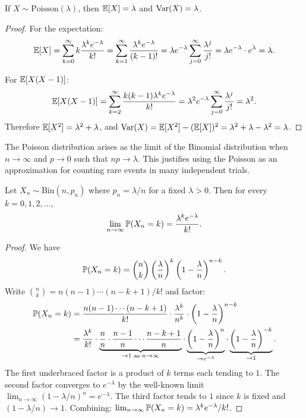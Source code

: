 \documentclass[11pt,a4paper]{article}
\begin{document}
\begin{proposition}
\label{prop:poisson_moments}
If $X \sim \mathrm{Poisson}(\lambda)$, then $\mathbb{E}[X] = \lambda$ and
$\operatorname{Var}(X) = \lambda$.
\end{proposition}

\begin{proof}
For the expectation:
\[
    \mathbb{E}[X] = \sum_{k=0}^\infty k \frac{\lambda^k e^{-\lambda}}{k!}
    = \sum_{k=1}^\infty \frac{\lambda^k e^{-\lambda}}{(k-1)!}
    = \lambda e^{-\lambda} \sum_{j=0}^\infty \frac{\lambda^j}{j!}
    = \lambda e^{-\lambda} \cdot e^\lambda = \lambda.
\]

For $\mathbb{E}[X(X-1)]$:
\[
    \mathbb{E}[X(X-1)] = \sum_{k=2}^\infty \frac{k(k-1) \lambda^k e^{-\lambda}}{k!}
    = \lambda^2 e^{-\lambda} \sum_{j=0}^\infty \frac{\lambda^j}{j!}
    = \lambda^2.
\]
Therefore $\mathbb{E}[X^2] = \lambda^2 + \lambda$, and
$\operatorname{Var}(X) = \mathbb{E}[X^2] - (\mathbb{E}[X])^2 = \lambda^2 + \lambda - \lambda^2
= \lambda$.
\end{proof}

\begin{keyresult}[title={Poisson Limit Theorem}]
The Poisson distribution arises as the limit of the Binomial distribution
when $n \to \infty$ and $p \to 0$ such that $np \to \lambda$. This
justifies using the Poisson as an approximation for counting rare events
in many independent trials.
\end{keyresult}

\begin{theorem}
\label{thm:poisson_limit}
Let $X_n \sim \mathrm{Bin}(n, p_n)$ where $p_n = \lambda / n$ for a
fixed $\lambda > 0$. Then for every $k = 0, 1, 2, \ldots$,
\[
    \lim_{n \to \infty} \mathbb{P}(X_n = k)
    = \frac{\lambda^k e^{-\lambda}}{k!}.
\]
\end{theorem}

\begin{proof}
We have
\[
    \mathbb{P}(X_n = k) = \binom{n}{k} \left(\frac{\lambda}{n}\right)^k
    \left(1 - \frac{\lambda}{n}\right)^{n-k}.
\]
Write $\binom{n}{k} = n(n-1)\cdots(n-k+1)/k!$ and factor:
\begin{align*}
    \Prob(X_n = k)
    &= \frac{n(n-1)\cdots(n-k+1)}{k!} \cdot \frac{\lambda^k}{n^k}
       \cdot \left(1 - \frac{\lambda}{n}\right)^{n-k} \\
    &= \frac{\lambda^k}{k!} \cdot
       \underbrace{\frac{n}{n} \cdot \frac{n-1}{n}
       \cdots \frac{n-k+1}{n}}_{\to 1 \text{ as } n \to \infty}
       \cdot \underbrace{\left(1 - \frac{\lambda}{n}\right)^n}_{%
       \to e^{-\lambda}}
       \cdot \underbrace{\left(1 - \frac{\lambda}{n}\right)^{-k}}_{%
       \to 1}.
\end{align*}
The first underbraced factor is a product of $k$ terms each tending to
$1$. The second factor converges to $e^{-\lambda}$ by the well-known
limit $\lim_{n \to \infty} (1 - \lambda/n)^n = e^{-\lambda}$. The third
factor tends to $1$ since $k$ is fixed and
$(1 - \lambda/n) \to 1$. Combining:
$\lim_{n \to \infty} \mathbb{P}(X_n = k) = \lambda^k e^{-\lambda} / k!$.
\end{proof}
\end{document}
